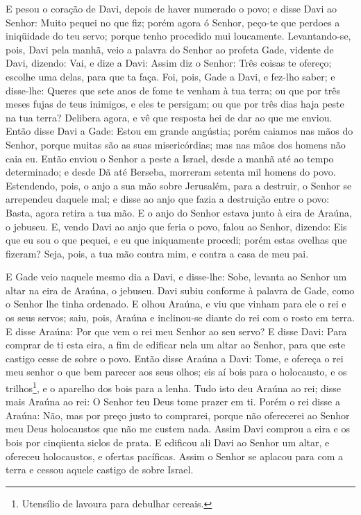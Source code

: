 E pesou o coração de Davi, depois de haver numerado o povo; e
disse Davi ao Senhor: Muito pequei no que fiz; porém agora ó Senhor,
peço-te que perdoes a iniqüidade do teu servo; porque tenho
procedido mui loucamente. Levantando-se, pois, Davi pela
manhã, veio a palavra do Senhor ao profeta Gade, vidente de Davi,
dizendo: Vai, e dize a Davi: Assim diz o Senhor: Três coisas
te ofereço; escolhe uma delas, para que ta faça. Foi, pois,
Gade a Davi, e fez-lho saber; e disse-lhe: Queres que sete anos de
fome te venham à tua terra; ou que por três meses fujas de teus
inimigos, e eles te persigam; ou que por três dias haja peste na tua
terra? Delibera agora, e vê que resposta hei de dar ao que me
enviou. Então disse Davi a Gade: Estou em grande angústia;
porém caiamos nas mãos do Senhor, porque muitas são as suas
misericórdias; mas nas mãos dos homens não caia eu. Então
enviou o Senhor a peste a Israel, desde a manhã até ao tempo
determinado; e desde Dã até Berseba, morreram setenta mil homens do
povo. Estendendo, pois, o anjo a sua mão sobre Jerusalém,
para a destruir, o Senhor se arrependeu daquele mal; e disse ao anjo
que fazia a destruição entre o povo: Basta, agora retira a tua mão.
E o anjo do Senhor estava junto à eira de Araúna, o jebuseu.
E, vendo Davi ao anjo que feria o povo, falou ao Senhor,
dizendo: Eis que eu sou o que pequei, e eu que iniquamente procedi;
porém estas ovelhas que fizeram? Seja, pois, a tua mão contra mim, e
contra a casa de meu pai.

E Gade veio naquele mesmo dia a Davi, e disse-lhe: Sobe, levanta
ao Senhor um altar na eira de Araúna, o jebuseu. Davi subiu
conforme à palavra de Gade, como o Senhor lhe tinha ordenado.
E olhou Araúna, e viu que vinham para ele o rei e os seus
servos; saiu, pois, Araúna e inclinou-se diante do rei com o rosto
em terra. E disse Araúna: Por que vem o rei meu Senhor ao seu
servo? E disse Davi: Para comprar de ti esta eira, a fim de edificar
nela um altar ao Senhor, para que este castigo cesse de sobre o
povo. Então disse Araúna a Davi: Tome, e ofereça o rei meu
senhor o que bem parecer aos seus olhos; eis aí bois para o
holocausto, e os trilhos\footnote{Utensílio de lavoura para debulhar
cereais.}, e o aparelho dos bois para a lenha. Tudo isto deu
Araúna ao rei; disse mais Araúna ao rei: O Senhor teu Deus tome
prazer em ti. Porém o rei disse a Araúna: Não, mas por preço
justo to comprarei, porque não oferecerei ao Senhor meu Deus
holocaustos que não me custem nada. Assim Davi comprou a eira e os
bois por cinqüenta siclos de prata. E edificou ali Davi ao
Senhor um altar, e ofereceu holocaustos, e ofertas pacíficas. Assim
o Senhor se aplacou para com a terra e cessou aquele castigo de
sobre Israel.

